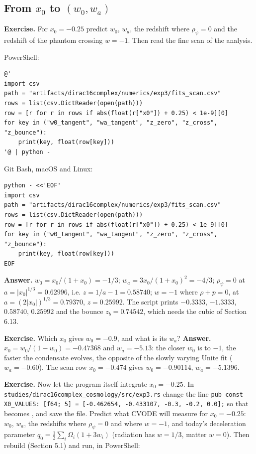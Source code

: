 \documentclass[11pt]{article}
\begin{document}
\subsection{From \texorpdfstring{$x_0$}{x\_0} to \texorpdfstring{$(w_0,w_a)$}{(w\_0,w\_a)}}

\textbf{Exercise.} For $x_0=-0.25$ predict $w_0$, $w_a$, the redshift where $\rho_\psi=0$ and the redshift of the phantom crossing $w=-1$. Then read the fine scan of the analysis.

PowerShell:

\begin{Verbatim}[fontsize=\small]
@'
import csv
path = "artifacts/dirac16complex/numerics/exp3/fits_scan.csv"
rows = list(csv.DictReader(open(path)))
row = [r for r in rows if abs(float(r["x0"]) + 0.25) < 1e-9][0]
for key in ("w0_tangent", "wa_tangent", "z_zero", "z_cross", "z_bounce"):
    print(key, float(row[key]))
'@ | python -
\end{Verbatim}

Git Bash, macOS and Linux:

\begin{Verbatim}[fontsize=\small]
python - <<'EOF'
import csv
path = "artifacts/dirac16complex/numerics/exp3/fits_scan.csv"
rows = list(csv.DictReader(open(path)))
row = [r for r in rows if abs(float(r["x0"]) + 0.25) < 1e-9][0]
for key in ("w0_tangent", "wa_tangent", "z_zero", "z_cross", "z_bounce"):
    print(key, float(row[key]))
EOF
\end{Verbatim}

\textbf{Answer.} $w_0=x_0/(1+x_0)=-1/3$; $w_a=3x_0/(1+x_0)^2=-4/3$; $\rho_\psi=0$ at $a=\lvert x_0\rvert^{1/3}=0.62996$, i.e. $z=1/a-1=0.58740$; $w=-1$ where $\rho+p=0$, at $a=(2\lvert x_0\rvert)^{1/3}=0.79370$, $z=0.25992$. The script prints $-0.3333$, $-1.3333$, $0.58740$, $0.25992$ and the bounce $z_b=0.74542$, which needs the cubic of Section 6.13.

\textbf{Exercise.} Which $x_0$ gives $w_0=-0.9$, and what is its $w_a$? \textbf{Answer.} $x_0=w_0/(1-w_0)=-0.47368$ and $w_a=-5.13$: the closer $w_0$ is to $-1$, the faster the condensate evolves, the opposite of the slowly varying Unite fit ($w_a=-0.60$). The scan row $x_0=-0.474$ gives $w_0=-0.90114$, $w_a=-5.1396$.

\textbf{Exercise.} Now let the program itself integrate $x_0=-0.25$. In \texttt{studies/\allowbreak{}dirac16c\allowbreak{}omplex\_c\allowbreak{}osmology\allowbreak{}/src/exp\allowbreak{}3.rs} change the line \texttt{pub cons\allowbreak{}t X0\_VAL\allowbreak{}UES: [f6\allowbreak{}4; 5] = \allowbreak{}[-0.4626\allowbreak{}54, -0.4\allowbreak{}33107, -\allowbreak{}0.3, -0.\allowbreak{}2, 0.0];} so that \texttt{} becomes \texttt{}, and save the file. Predict what CVODE will measure for $x_0=-0.25$: $w_0$, $w_a$, the redshifts where $\rho_\psi=0$ and where $w=-1$, and today's deceleration parameter $q_0=\frac12\sum_i\Omega_i(1+3w_i)$ (radiation has $w=1/3$, matter $w=0$). Then rebuild (Section 5.1) and run, in PowerShell:
\end{document}
